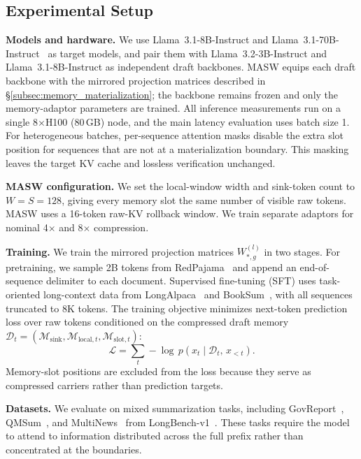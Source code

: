 \subsection{Experimental Setup}
\label{subsec:setup}

\textbf{Models and hardware.}
We use Llama~3.1-8B-Instruct and Llama~3.1-70B-Instruct~\citep{grattafiori2024llama3herdmodels} as target models, and pair them with Llama~3.2-3B-Instruct and Llama~3.1-8B-Instruct as independent draft backbones.
MASW equips each draft backbone with the mirrored projection matrices described in \S\ref{subsec:memory_materialization}; the backbone remains frozen and only the memory-adaptor parameters are trained.
All inference measurements run on a single 8$\times$H100 (80\,GB) node, and the main latency evaluation uses batch size 1.
For heterogeneous batches, per-sequence attention masks disable the extra slot position for sequences that are not at a materialization boundary.
This masking leaves the target KV cache and lossless verification unchanged.

\textbf{MASW configuration.}
We set the local-window width and sink-token count to $W=S=128$, giving every memory slot the same number of visible raw tokens.
MASW uses a 16-token raw-KV rollback window.
We train separate adaptors for nominal 4$\times$ and 8$\times$ compression.

\textbf{Training.}
We train the mirrored projection matrices $W_{\ast,g}^{(l)}$ in two stages.
For pretraining, we sample 2B tokens from RedPajama~\citep{weber2024redpajama} and append an end-of-sequence delimiter to each document.
Supervised fine-tuning (SFT) uses task-oriented long-context data from LongAlpaca~\citep{chen2024longlora} and BookSum~\citep{kryscinski-etal-2022-booksum}, with all sequences truncated to 8K tokens.
The training objective minimizes next-token prediction loss over raw tokens conditioned on the compressed draft memory $\mathcal{D}_t=(\mathcal{M}_{\mathrm{sink}},\mathcal{M}_{\mathrm{local},t},\mathcal{M}_{\mathrm{slot},t})$:
\begin{equation*}
    \mathcal{L}
    =
    \sum_t
    -\log\,
    p(x_t \mid \mathcal{D}_t,\, x_{<t}).
\end{equation*}
Memory-slot positions are excluded from the loss because they serve as compressed carriers rather than prediction targets.

\textbf{Datasets.}
We evaluate on mixed summarization tasks, including GovReport~\citep{huang-etal-2021-efficient}, QMSum~\citep{zhong-etal-2021-qmsum}, and MultiNews~\citep{fabbri-etal-2019-multi} from LongBench-v1~\citep{conf/acl/BaiLZL0HDLZHDTL24}. These tasks require the model to attend to information distributed across the full prefix rather than concentrated at the boundaries.

